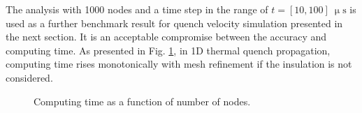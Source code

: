 The analysis with 1000 nodes and a time step in the range of $t=[10, 100]~\upmu \text{s}$ is used as a further benchmark result for quench velocity simulation presented in the next section. It is an acceptable compromise between the accuracy and computing time. As presented in Fig. \ref{fig: q_vel_modelling_heat_balance_computing_time_no_insulation}, in 1D thermal quench propagation, computing time rises monotonically with mesh refinement if the insulation is not considered. 

\begin{figure}[H]
\centering
    \caption{Computing time as a function of number of nodes.}
    \label{fig: q_vel_modelling_heat_balance_computing_time_no_insulation}
\end{figure}